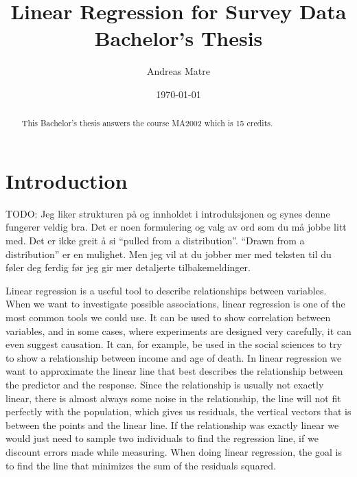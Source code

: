 \documentclass{article}
\title{Linear Regression for Survey Data \\
{\Large Bachelor's Thesis}}
\author{Andreas Matre}
\date{\today}
\begin{document}
\newtheorem{definition}{Definition}
\newtheorem{theorem}{Theorem}
\newtheorem{example}{Example}


\maketitle

\begin{abstract}
  This Bachelor's thesis answers the course MA2002 which is 15 credits.
\end{abstract}

\newpage

\tableofcontents

\newpage

\section{Introduction}

TODO: Jeg liker strukturen på og innholdet i introduksjonen og synes denne fungerer veldig bra. Det er noen formulering og valg av ord som du må jobbe litt med. Det er ikke greit å si “pulled from a distribution”. “Drawn from a distribution” er en mulighet. Men jeg vil at du jobber mer med teksten til du føler deg ferdig før jeg gir mer detaljerte tilbakemeldinger.

Linear regression is a useful tool to describe relationships between variables.
When we want to investigate possible associations, linear regression
is one of the most common tools we could use. It can be used to show correlation between
variables, and in some cases, where experiments are designed very carefully, it can even suggest causation.
It can, for example, be used in the social sciences to try to show a relationship
between income and age of death. In linear regression we want to approximate the
linear line that best describes the relationship between the predictor and the
response. Since the relationship is usually not exactly linear, there is almost
always some noise in the relationship, the line will not
fit perfectly with the population, which gives us residuals, the vertical
vectors that is between the points and the linear line. If the relationship was
exactly linear we would just need to sample two individuals to find the
regression line, if we discount errors made while measuring. When doing linear
regression, the goal is to find the line that minimizes the sum of the residuals squared.
\end{document}
